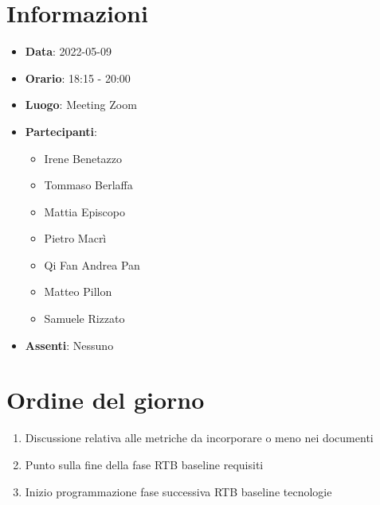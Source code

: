 \section{Informazioni}
	\begin{itemize}
		\item \textbf{Data}: 2022-05-09     %
		\item \textbf{Orario}:       18:15 - 20:00       %
		\item \textbf{Luogo}: Meeting Zoom
		\item \textbf{Partecipanti}:
		\begin{itemize}
			\item Irene Benetazzo
			\item Tommaso Berlaffa
			\item Mattia Episcopo
			\item Pietro Macrì
			\item Qi Fan Andrea Pan
			\item Matteo Pillon
			\item Samuele Rizzato
		\end{itemize}
        \item \textbf{Assenti}: Nessuno
	\end{itemize}
    
	\section{Ordine del giorno}
	\begin{enumerate}
		\item Discussione relativa alle metriche da incorporare o meno nei documenti
  		\item Punto sulla fine della fase RTB baseline requisiti
   	 	\item Inizio programmazione fase successiva RTB baseline tecnologie
	\end{enumerate}
	\newpage
